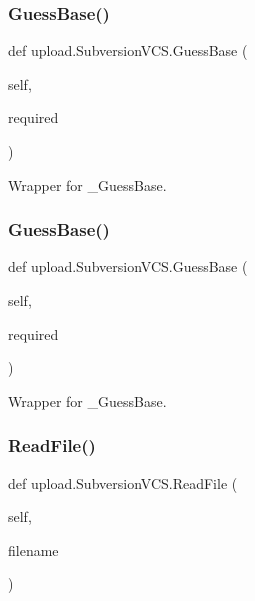 \subsubsection{\texorpdfstring{Guess\+Base()}{GuessBase()}\hspace{0.1cm}{\footnotesize\ttfamily [1/2]}}
{\footnotesize\ttfamily def upload.\+Subversion\+V\+C\+S.\+Guess\+Base (\begin{DoxyParamCaption}\item[{}]{self,  }\item[{}]{required }\end{DoxyParamCaption})}

\begin{DoxyVerb}Wrapper for _GuessBase.\end{DoxyVerb}
 \mbox{\label{classupload_1_1SubversionVCS_a7d22d459469a757270502ce0dccacbd2}} 
\subsubsection{\texorpdfstring{Guess\+Base()}{GuessBase()}\hspace{0.1cm}{\footnotesize\ttfamily [2/2]}}
{\footnotesize\ttfamily def upload.\+Subversion\+V\+C\+S.\+Guess\+Base (\begin{DoxyParamCaption}\item[{}]{self,  }\item[{}]{required }\end{DoxyParamCaption})}

\begin{DoxyVerb}Wrapper for _GuessBase.\end{DoxyVerb}
 \mbox{\label{classupload_1_1SubversionVCS_a340d269b74386ac863636f6b0683d9f4}} 
\subsubsection{\texorpdfstring{Read\+File()}{ReadFile()}\hspace{0.1cm}{\footnotesize\ttfamily [1/2]}}
{\footnotesize\ttfamily def upload.\+Subversion\+V\+C\+S.\+Read\+File (\begin{DoxyParamCaption}\item[{}]{self,  }\item[{}]{filename }\end{DoxyParamCaption})}

